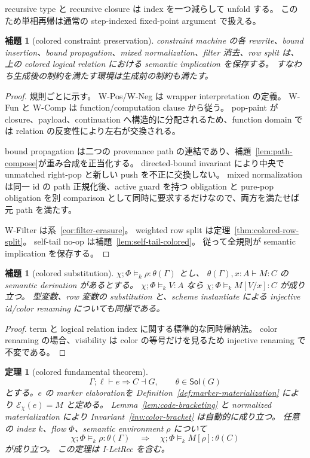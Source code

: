 \documentclass[uplatex,dvipdfmx,a4paper,10.5pt]{jsarticle}
\theoremstyle{jpplain}
\newtheorem{lemma}[definition]{補題}
\newtheorem{theorem}[definition]{定理}
\newcommand{\sol}{\mathsf{Sol}}
\newcommand{\Elab}{\mathcal E}
\begin{document}
recursive type と recursive closure は index を一つ減らして unfold する。
このため単相再帰は通常の step-indexed fixed-point argument で扱える。

\begin{lemma}[colored constraint preservation]\label{lem:colored-constraint-preservation}
constraint machine の各 rewrite、bound insertion、bound propagation、mixed normalization、filter 消去、row split は、
上の colored logical relation における semantic implication を保存する。
すなわち生成後の制約を満たす環境は生成前の制約も満たす。
\end{lemma}

\begin{proof}
規則ごとに示す。
W-Pos/W-Neg は wrapper interpretation の定義。
W-Fun と W-Comp は function/computation clause から従う。
pop-paint が closure、payload、continuation へ構造的に分配されるため、function domain では relation の反変性により左右が交換される。

bound propagation は二つの provenance path の連結であり、補題~\ref{lem:path-compose}が重み合成を正当化する。
directed-bound invariant により中央で unmatched right-pop と新しい push を不正に交換しない。
mixed normalization は同一 id の path 正規化後、active guard を持つ obligation と pure-pop obligation を別 comparison として同時に要求するだけなので、両方を満たせば元 path を満たす。

W-Filter は系~\ref{cor:filter-erasure}。
weighted row split は定理~\ref{thm:colored-row-split}。
self-tail no-op は補題~\ref{lem:self-tail-colored}。
従って全規則が semantic implication を保存する。
\end{proof}

\begin{lemma}[colored substitution]
$\chi;\Phi\models_k\rho:\theta(\Gamma)$ とし、
$\theta(\Gamma),x:A\vdash M:C$ の semantic derivation があるとする。
$\chi;\Phi\models_k V:A$ なら
$\chi;\Phi\models_k M[V/x]:C$ が成り立つ。
型変数、row 変数の substitution と、scheme instantiate による injective id/color renaming についても同様である。
\end{lemma}

\begin{proof}
term と logical relation index に関する標準的な同時帰納法。
color renaming の場合、visibility は color の等号だけを見るため injective renaming で不変である。
\end{proof}

\begin{theorem}[colored fundamental theorem]\label{thm:colored-fundamental}
\[
  \Gamma;\ell\vdash e\Rightarrow C\dashv G,
  \qquad \theta\in\sol(G)
\]
とする。$e$ の marker elaborationを Definition~\ref{def:marker-materialization} により
$\Elab_{\chi}(e)=M$ と定める。
Lemma~\ref{lem:code-bracketing} と normalized materialization により Invariant~\ref{inv:color-bracket} は自動的に成り立つ。
任意の index $k$、flow $\Phi$、semantic environment $\rho$ について
\[
  \chi;\Phi\models_k\rho:\theta(\Gamma)
  \quad\Longrightarrow\quad
  \chi;\Phi\models_k M[\rho]:\theta(C)
\]
が成り立つ。
この定理は I-LetRec を含む。
\end{theorem}
\end{document}
